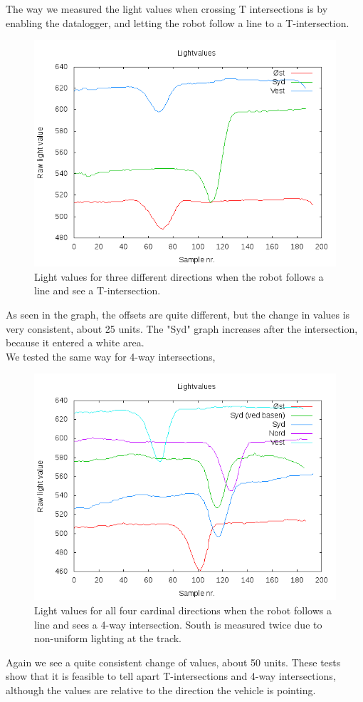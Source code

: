The way we measured the light values when crossing T intersections is by
enabling the datalogger, and letting the robot follow a line to a T-intersection.
\begin{figure}[hbt]
  \centering
  \includegraphics[scale=0.5]{../experiments/2prototype/results/gnuplot/retningsbaseret_3vejs.png}
  \caption{Light values for three different directions when the robot follows a line and see a T-intersection.}
\end{figure}
As
seen in the graph, the offsets are quite different, but the change in
values is very consistent, about 25 units. The "Syd" graph increases after
the intersection, because it entered a white area.\\We tested the same
way for 4-way intersections,
\begin{figure}[hbt]
  \centering
  \includegraphics[scale=0.5]{../experiments/2prototype/results/gnuplot/retningsbaseret_4vejs.png}
  \caption{Light values for all four cardinal directions when the robot follows a line and sees a 4-way intersection. South is measured twice due to non-uniform lighting at the track.}
\end{figure}
Again
we see a quite consistent change of values, about 50 units. These tests
show that it is feasible to tell apart T-intersections and 4-way
intersections, although the values are relative to the direction the
vehicle is pointing.


